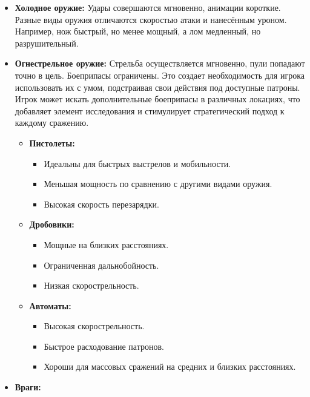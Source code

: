 \documentclass[12pt]{article}
\begin{document}
        \begin{itemize}
            \item \textbf{Холодное оружие:} Удары совершаются мгновенно, анимации короткие. Разные виды оружия отличаются скоростью атаки и нанесённым уроном. Например, нож быстрый, но менее мощный, а лом медленный, но разрушительный.
            \item \textbf{Огнестрельное оружие:} Стрельба осуществляется мгновенно, пули попадают точно в цель. Боеприпасы ограничены.  Это создает необходимость для игрока использовать их с умом, подстраивая свои действия под доступные патроны. Игрок может искать дополнительные боеприпасы в различных локациях, что добавляет элемент исследования и стимулирует стратегический подход к каждому сражению.
            \begin{itemize}
                \item \textbf{Пистолеты:} 
                \begin{itemize}
                    \item Идеальны для быстрых выстрелов и мобильности.
                    \item Меньшая мощность по сравнению с другими видами оружия.
                    \item Высокая скорость перезарядки.
                \end{itemize}
                \item \textbf{Дробовики:} 
                \begin{itemize}
                    \item Мощные на близких расстояниях.
                    \item Ограниченная дальнобойность.
                    \item Низкая скорострельность.
                \end{itemize}
                \item \textbf{Автоматы:} 
                \begin{itemize}
                    \item Высокая скорострельность.
                    \item Быстрое расходование патронов.
                    \item Хороши для массовых сражений на средних и близких расстояниях.
                \end{itemize}
            \end{itemize}
            \item \textbf{Враги:} 
                \begin{itemize}

\end{itemize}
\end{itemize}
\end{document}
